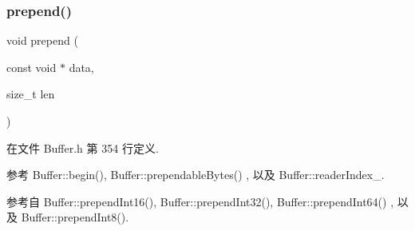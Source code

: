 \subsubsection{\texorpdfstring{prepend()}{prepend()}}
{\footnotesize\ttfamily void prepend (\begin{DoxyParamCaption}\item[{const void $\ast$}]{data,  }\item[{size\+\_\+t}]{len }\end{DoxyParamCaption})\hspace{0.3cm}{\ttfamily [inline]}}



在文件 Buffer.\+h 第 354 行定义.



参考 Buffer\+::begin(), Buffer\+::prependable\+Bytes() , 以及 Buffer\+::reader\+Index\+\_\+.



参考自 Buffer\+::prepend\+Int16(), Buffer\+::prepend\+Int32(), Buffer\+::prepend\+Int64() , 以及 Buffer\+::prepend\+Int8().

